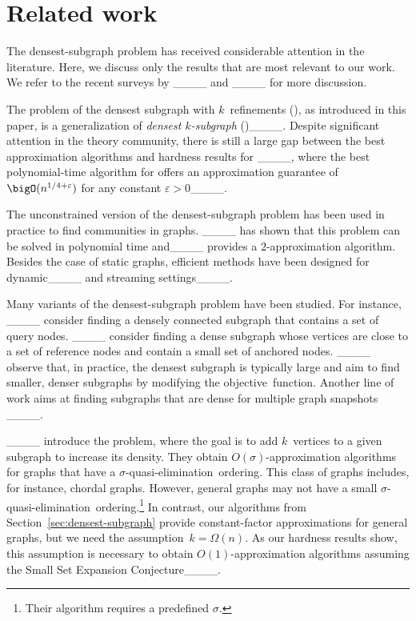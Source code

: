\section{Related work}
\label{sec:related}

The densest-subgraph problem has received considerable attention in the literature. Here, we discuss only the results that are most relevant to our work. 
We refer to the recent surveys by ____ and ____ for more discussion.

The problem of the densest subgraph with $k$~refinements (\dskc), as introduced in this paper, is a generalization of \emph{densest $k$-subgraph} (\dks)____.
Despite significant attention in the theory community, there is still a large gap between the best approximation algorithms and hardness results for 
\dks____,
where the best polynomial-time algorithm for \dks offers an approximation guarantee of $\bigO(n^{1/4+\varepsilon})$ for any constant $\varepsilon >0$____.

The unconstrained version of the densest-subgraph problem has been used in practice to find communities in graphs. 
____ has shown that this problem can be solved in polynomial
time and____ provides a $2$-approximation algorithm.  
Besides the case of static graphs, efficient methods have been designed for  dynamic____ and streaming settings____.

Many variants of the densest-subgraph problem have been studied. For instance, ____ consider finding a densely connected subgraph that contains a set of query nodes.
____ consider finding a dense subgraph whose vertices are close to a set of reference nodes and contain a small set of anchored nodes.
____ observe that, in practice, the densest subgraph is typically large and 
aim to find smaller, denser subgraphs by modifying the objective~function. 
Another line of work aims at finding subgraphs that are dense for multiple graph snap\-shots ____.

____ introduce the \kdense problem, where the goal is to add
$k$~vertices to a given subgraph to increase its density. 
They obtain $O(\sigma)$-approximation algorithms for graphs that have a $\sigma$-quasi-elimination~ordering. 
This class of graphs includes, for instance, chordal graphs. However, general graphs may not have a small $\sigma$-quasi-elimination~ordering.\footnote{Their algorithm requires a predefined $\sigma$.}
In contrast, our algorithms from Section~\ref{sec:densest-subgraph} provide constant-factor approximations for general graphs, but we need the assumption~$k=\Omega(n)$. 
As our hardness results show, this assumption is necessary to obtain $O(1)$-approximation algorithms assuming the 
Small Set Expansion Conjecture____.

